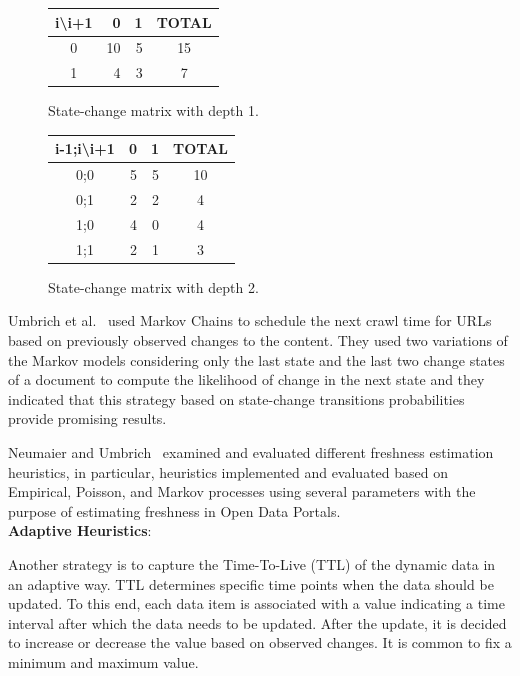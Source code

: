 \documentclass[sw]{iosart2x}
\begin{document}
\begin{figure}[h]
	\begin{minipage}[b]{0.45\linewidth}
		\begin{tabular}{c|rr|c}
			i\textbackslash{}i+1 & 0  & 1 & TOTAL \\    \hline 
			0                    & 10 & 5 & 15    \\
			1                    & 4  & 3 & 7     
		\end{tabular}
		\caption{State-change matrix with depth 1.}
		\label{tab:state1}
	\end{minipage}
	\hspace{0.5cm}
	\begin{minipage}[b]{0.45\linewidth}
		\centering
		\begin{tabular}{c|rr|c}
			i-1;i\textbackslash{}i+1 & 0 & 1 & TOTAL \\    \hline 
			0;0                    & 5 & 5 & 10    \\
			0;1                    & 2 & 2 & 4     \\
			1;0                    & 4 & 0 & 4     \\
			1;1                    & 2 & 1 & 3    
		\end{tabular}
		\centering
		\caption{State-change matrix with depth 2.}
		\label{tab:state2}
	\end{minipage}
\end{figure}

Umbrich et al.~\cite{UmbrichMP15} used Markov Chains to schedule the next crawl time for URLs based on previously observed changes to the content. They used two variations of the Markov models considering only the last state and the last two change states of a document to compute the likelihood of change in the next state and they indicated that this strategy based on state-change transitions probabilities provide promising results.

Neumaier and Umbrich~\cite{NeumaierU16} examined and evaluated different freshness estimation heuristics, in particular, heuristics implemented and evaluated based on Empirical, Poisson, and Markov processes using several parameters with the purpose of estimating freshness in Open Data Portals.\\

\textbf{Adaptive Heuristics}:

Another strategy is to capture the Time-To-Live (TTL) of the dynamic data in an adaptive way. TTL determines specific time points when the data should be updated. To this end, each data item is associated with a value indicating a time interval after which the data needs to be updated. After the update, it is decided to increase or decrease the value based on observed changes. It is common to fix a minimum and maximum value.
\end{document}
